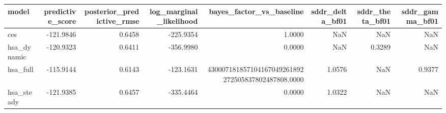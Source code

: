 \begin{tabular}{lrrrrrrr}
\toprule
model & predictive\_score & posterior\_predictive\_rmse & log\_marginal\_likelihood & bayes\_factor\_vs\_baseline & sddr\_delta\_bf01 & sddr\_theta\_bf01 & sddr\_gamma\_bf01 \\
\midrule
ces & -121.9846 & 0.6458 & -225.9354 & 1.0000 & NaN & NaN & NaN \\
hsa\_dynamic & -120.9323 & 0.6411 & -356.9980 & 0.0000 & NaN & 0.3289 & NaN \\
hsa\_full & -115.9144 & 0.6143 & -123.1631 & 430007181857104167049261892272505837802487808.0000 & 1.0576 & NaN & 0.9377 \\
hsa\_steady & -121.9385 & 0.6457 & -335.4464 & 0.0000 & 1.0322 & NaN & NaN \\
\bottomrule
\end{tabular}
